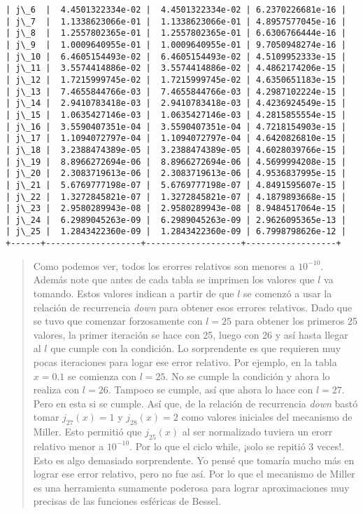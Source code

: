 \documentclass[9pt]{article}
\begin{document}
\begin{Verbatim}[commandchars=\\\{\}]
| j\_6  |  4.4501322334e-02 |  4.4501322334e-02 | 6.2370226681e-16 |
| j\_7  |  1.1338623066e-01 |  1.1338623066e-01 | 4.8957577045e-16 |
| j\_8  |  1.2557802365e-01 |  1.2557802365e-01 | 6.6306766444e-16 |
| j\_9  |  1.0009640955e-01 |  1.0009640955e-01 | 9.7050948274e-16 |
| j\_10 |  6.4605154493e-02 |  6.4605154493e-02 | 4.5109952333e-15 |
| j\_11 |  3.5574414886e-02 |  3.5574414886e-02 | 4.4862174206e-15 |
| j\_12 |  1.7215999745e-02 |  1.7215999745e-02 | 4.6350651183e-15 |
| j\_13 |  7.4655844766e-03 |  7.4655844766e-03 | 4.2987102224e-15 |
| j\_14 |  2.9410783418e-03 |  2.9410783418e-03 | 4.4236924549e-15 |
| j\_15 |  1.0635427146e-03 |  1.0635427146e-03 | 4.2815855554e-15 |
| j\_16 |  3.5590407351e-04 |  3.5590407351e-04 | 4.7218154903e-15 |
| j\_17 |  1.1094072797e-04 |  1.1094072797e-04 | 4.6420826810e-15 |
| j\_18 |  3.2388474389e-05 |  3.2388474389e-05 | 4.6028039766e-15 |
| j\_19 |  8.8966272694e-06 |  8.8966272694e-06 | 4.5699994208e-15 |
| j\_20 |  2.3083719613e-06 |  2.3083719613e-06 | 4.9536837995e-15 |
| j\_21 |  5.6769777198e-07 |  5.6769777198e-07 | 4.8491595607e-15 |
| j\_22 |  1.3272845821e-07 |  1.3272845821e-07 | 4.1879893668e-15 |
| j\_23 |  2.9580289943e-08 |  2.9580289943e-08 | 8.9484517064e-15 |
| j\_24 |  6.2989045263e-09 |  6.2989045263e-09 | 2.9626095365e-13 |
| j\_25 |  1.2843422360e-09 |  1.2843422360e-09 | 6.7998798626e-12 |
+------+-------------------+-------------------+------------------+
    \end{Verbatim}

    \begin{quote}
Como podemos ver, todos los erorres relativos son menores a
\(10^{-10}\). Además note que antes de cada tabla se imprimen los
valores que \(l\) va tomando. Estos valores indican a partir de que
\(l\) se comenzó a usar la relación de recurrencia \emph{down} para
obtener esos errores relativos. Dado que se tuvo que comenzar
forzosamente con \(l=25\) para obtener los primeros 25 valores, la
primer iteración se hace con 25, luego con 26 y así hasta llegar al
\(l\) que cumple con la condición. Lo sorprendente es que requieren muy
pocas iteraciones para logar ese error relativo. Por ejemplo, en la
tabla \(x=0.1\) se comienza con \(l=25\). No se cumple la condición y
ahora lo realiza con \(l=26\). Tampoco se cumple, así que ahora lo hace
con \(l=27\). Pero en esta si se cumple. Así que, de la relación de
recurrencia \emph{down} bastó tomar \(j_{27}(x)=1\) y \(j_{28}(x)=2\)
como valores iniciales del mecanismo de Miller. Esto permitió que
\(j_{25}(x)\) al ser normalizado tuviera un erorr relativo menor a
\(10^{-10}\). Por lo que el ciclo while, ¡solo se repitió 3 veces!. Esto
es algo demasiado sorprendente. Yo pensé que tomaría mucho más en lograr
ese error relativo, pero no fue así. Por lo que el mecanismo de Miller
es una herramienta sumamente poderosa para lograr aproximaciones muy
precisas de las funciones esféricas de Bessel.
\end{quote}
\end{document}
